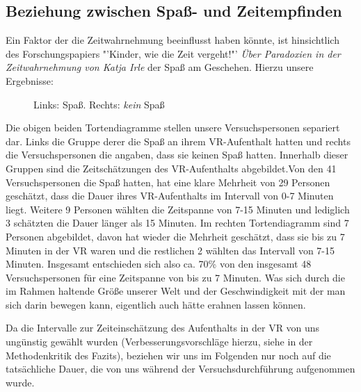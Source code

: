 \documentclass{Paper}
\begin{document}
\subsection{Beziehung zwischen Spaß- und Zeitempfinden}
\par
Ein Faktor der die Zeitwahrnehmung beeinflusst haben könnte, ist hinsichtlich des Forschungspapiers "'Kinder, wie die Zeit vergeht!"'
\textit{Über Paradoxien in der Zeitwahrnehmung von Katja Irle} \cite{Irle2017} der Spaß am Geschehen.
Hierzu unsere Ergebnisse:
	
\begin{figure}[H]
\caption{Links: Spaß. Rechts: \textit{kein} Spaß}
\label{Spass}
\end{figure} %

Die obigen beiden Tortendiagramme stellen unsere Versuchspersonen separiert dar. Links die Gruppe derer die Spaß an ihrem VR-Aufenthalt hatten und rechts die Versuchspersonen die angaben, dass sie keinen Spaß hatten. Innerhalb dieser Gruppen sind die Zeitschätzungen des VR-Aufenthalts abgebildet.Von den 41 Versuchspersonen die Spaß hatten, hat eine klare Mehrheit von 29 Personen geschätzt, dass die Dauer ihres VR-Aufenthalts im Intervall von 0-7 Minuten liegt. Weitere 9 Personen wählten die Zeitspanne von 7-15 Minuten und lediglich 3 schätzten die Dauer länger als 15 Minuten. Im rechten Tortendiagramm sind 7 Personen abgebildet, davon hat wieder die Mehrheit geschätzt, dass sie bis zu 7 Minuten in der VR waren und die restlichen 2 wählten das Intervall von 7-15 Minuten. Insgesamt entschieden sich also ca. 70\% von den insgesamt 48 Versuchspersonen für eine Zeitspanne von bis zu 7 Minuten. Was sich durch die im Rahmen haltende Größe unserer Welt und der Geschwindigkeit mit der man sich darin bewegen kann, eigentlich auch hätte erahnen lassen können.

\par
Da die Intervalle zur Zeiteinschätzung des Aufenthalts in der VR von uns ungünstig gewählt wurden (Verbesserungsvorschläge hierzu, siehe in der Methodenkritik des Fazits), beziehen wir uns im Folgenden nur noch auf die tatsächliche Dauer, die von uns während der Versuchsdurchführung aufgenommen wurde. 
\end{document}
